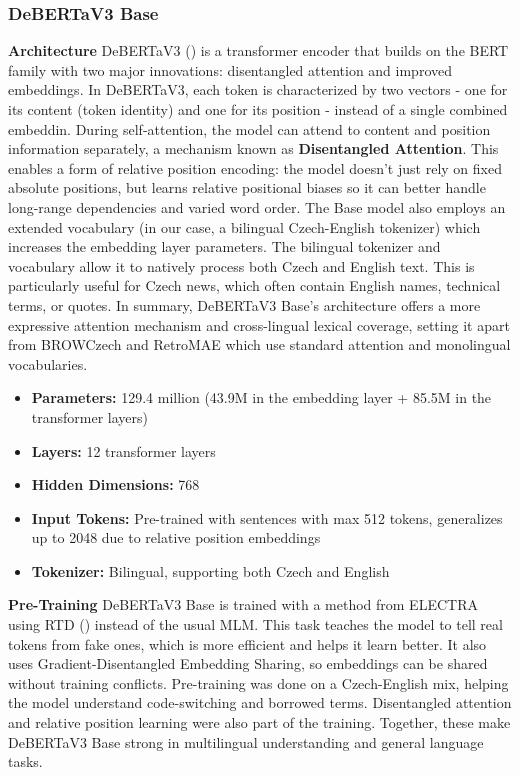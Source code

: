 \subsubsection{\ac{DeBERTaV3} Base}
\textbf{Architecture}
\ac{DeBERTaV3} (\cite{he2021debertav3}) is a transformer encoder that builds on the \ac{BERT} family with two major innovations: disentangled attention and improved embeddings. In \ac{DeBERTaV3}, each token is characterized by two vectors - one for its content (token identity) and one for its position - instead of a single combined embeddin. During self-attention, the model can attend to content and position information separately, a mechanism known as \textbf{Disentangled Attention}. This enables a form of relative position encoding: the model doesn't just rely on fixed absolute positions, but learns relative positional biases so it can better handle long-range dependencies and varied word order. The Base model also employs an extended vocabulary (in our case, a bilingual Czech-English tokenizer) which increases the embedding layer parameters. The bilingual tokenizer and vocabulary allow it to natively process both Czech and English text. This is particularly useful for Czech news, which often contain English names, technical terms, or quotes. In summary, \ac{DeBERTaV3} Base's architecture offers a more expressive attention mechanism and cross-lingual lexical coverage, setting it apart from \ac{BROWCzech} and \ac{RetroMAE} which use standard attention and monolingual vocabularies.

\begin{itemize}
  \item \textbf{Parameters:} 129.4 million (43.9M in the embedding layer + 85.5M in the transformer layers)
  \item \textbf{Layers:} 12 transformer layers
  \item \textbf{Hidden Dimensions:} 768
  \item \textbf{Input Tokens:} Pre-trained with sentences with max 512 tokens, generalizes up to 2048 due to relative position embeddings
  \item \textbf{Tokenizer:} Bilingual, supporting both Czech and English
\end{itemize}

\textbf{Pre-Training}
\ac{DeBERTaV3} Base is trained with a method from \ac{ELECTRA} using \ac{RTD} (\cite{clark2020electra}) instead of the usual MLM. This task teaches the model to tell real tokens from fake ones, which is more efficient and helps it learn better. It also uses Gradient-Disentangled Embedding Sharing, so embeddings can be shared without training conflicts. Pre-training was done on a Czech-English mix, helping the model understand code-switching and borrowed terms. Disentangled attention and relative position learning were also part of the training. Together, these make \ac{DeBERTaV3} Base strong in multilingual understanding and general language tasks.

